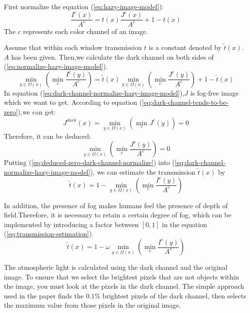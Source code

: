 \documentclass[journal,comsoc]{IEEEtran}
\begin{document}
First normalize the equation (\ref{eq:hazy-image-model}):
\begin{equation}
  \label{eq:normalize-hazy-image-model}
  \frac{I^c(x)}{A^c}=t(x)\frac{J^c(x)}{A^c}+1-t(x)
\end{equation}
The $c$ represents each color channel of an image.

Assume that within each window transmission $t$ is a constant denoted by $\tilde{t}(x)$.$A$ has been given.
Then,we calculate the dark channel on both sides of (\ref{eq:normalize-hazy-image-model}).
\begin{equation}
  \label{eq:dark-channel-normalize-hazy-image-model}
  \min_{y\in{\Omega{(x)}}}(\min_c{\frac{I^c(y)}{A^c}})=\tilde{t}(x)\min_{y\in{\Omega{(x)}}}(\min_c{\frac{J^c(y)}{A^c}})+1-\tilde{t}(x)
\end{equation}
In equation (\ref{eq:dark-channel-normalize-hazy-image-model}),$J$ is fog-free image which we want to get.
According to equation (\ref{eq:dark-channel-tends-to-be-zero}),we can get:
\begin{equation}
  \label{eq:zero-dark-channel-normalize-hazy-image-model}
  J^{dark}(x)=\min_{y\in{\Omega{(x)}}}(\min_{c}J^c(y))=0
\end{equation}
Therefore, it can be deduced:
\begin{equation}
  \label{eq:deduced-zero-dark-channel-normalize}
  \min_{y\in{\Omega{(x)}}}(\min_{c}\frac{J^c(y)}{A^c})=0
\end{equation}
Putting (\ref{eq:deduced-zero-dark-channel-normalize}) into (\ref{eq:dark-channel-normalize-hazy-image-model}),
we can estimate the transmission $\tilde{t}(x)$ by
\begin{equation}
  \label{eq:transmission-estimation}
  \tilde{t}(x)=1-\min_{y\in{\Omega{(x)}}}(\min_c{\frac{I^c(y)}{A^c}})
\end{equation}

In addition, the presence of fog makes humans feel the presence of depth of field.Therefore, it is necessary to
retain a certain degree of fog, which can be implemented by introducing a factor between $[0,1]$ in the equation
(\ref{eq:transmission-estimation}).
\begin{equation}
  \label{eq:parameter-transmission-estimation}
  \tilde{t}(x)=1-\omega\min_{y\in{\Omega{(x)}}}(\min_c{\frac{I^c(y)}{A^c}})
\end{equation}

The atmospheric light is calculated using the dark channel and the original image. To ensure that we select the
brightest pixels that are not objects within the image, you must look at the pixels in the dark channel.
The simple approach used in the paper \cite{dark-channel} finds the $0.1\%$ brightest pixels of the dark channel,
then selects the maximum value from those pixels in the original image.
\end{document}
